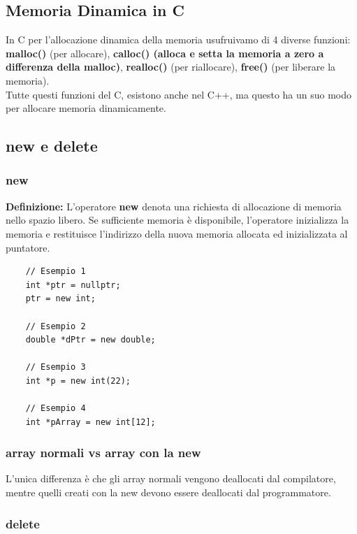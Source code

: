 \subsection{Memoria Dinamica in C}

\textsf{\small In C per l'allocazione dinamica della memoria usufruivamo di 4 diverse funzioni: \textbf{malloc()} (per allocare), \textbf{calloc() (alloca e setta la memoria a zero a differenza della malloc)}, \textbf{realloc()} (per riallocare), \textbf{free()} (per liberare la memoria).} \\

\textsf{\small Tutte questi funzioni del C, esistono anche nel C++, ma questo ha un suo modo per allocare memoria dinamicamente.} \break

\subsection{new e delete}

\subsubsection{new}

\textsf{\small \textbf{Definizione: } L'operatore \textbf{new} denota una richiesta di allocazione di memoria nello spazio libero. Se sufficiente memoria è disponibile, l'operatore inizializza la memoria e restituisce l'indirizzo della nuova memoria allocata ed inizializzata al puntatore.} \\

\begin{lstlisting}
	// Esempio 1
	int *ptr = nullptr;
	ptr = new int;
	
	// Esempio 2
	double *dPtr = new double;
	
	// Esempio 3
	int *p = new int(22);
	
	// Esempio 4
	int *pArray = new int[12];
\end{lstlisting}

\subsubsection{array normali vs array con la new}

\textsf{\small L'unica differenza è che gli array normali vengono deallocati dal compilatore, mentre quelli creati con la new devono essere deallocati dal programmatore.} \break

\subsubsection{delete}

